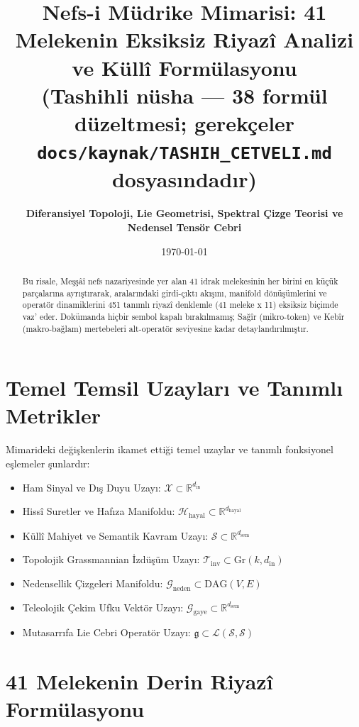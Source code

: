 \documentclass[11pt, a4paper]{article}
\title{\textbf{Nefs-i Müdrike Mimarisi: 41 Melekenin Eksiksiz Riyazî Analizi ve Küllî Formülasyonu}\\ \normalsize\textmd{(Tashihli nüsha --- 38 formül düzeltmesi; gerekçeler \texttt{docs/kaynak/TASHIH\_CETVELI.md} dosyasındadır)}}
\author{\textbf{Diferansiyel Topoloji, Lie Geometrisi, Spektral Çizge Teorisi ve Nedensel Tensör Cebri}}
\date{\today}
\begin{document}
\maketitle

\begin{abstract}
Bu risale, Meşşâî nefs nazariyesinde yer alan 41 idrak melekesinin her birini en küçük parçalarına ayrıştırarak, aralarındaki girdi-çıktı akışını, manifold dönüşümlerini ve operatör dinamiklerini 451 tanımlı riyazî denklemle (41 meleke x 11) eksiksiz biçimde vaz' eder. Dokümanda hiçbir sembol kapalı bırakılmamış; Sağîr (mikro-token) ve Kebîr (makro-bağlam) mertebeleri alt-operatör seviyesine kadar detaylandırılmıştır.
\end{abstract}

\section{Temel Temsil Uzayları ve Tanımlı Metrikler}

Mimarideki değişkenlerin ikamet ettiği temel uzaylar ve tanımlı fonksiyonel eşlemeler şunlardır:
\begin{itemize}
    \item Ham Sinyal ve Dış Duyu Uzayı: $\mathcal{X} \subset \mathbb{R}^{d_{\text{in}}}$
    \item Hissî Suretler ve Hafıza Manifoldu: $\mathcal{H}_{\text{hayal}} \subset \mathbb{R}^{d_{\text{hayal}}}$
    \item Küllî Mahiyet ve Semantik Kavram Uzayı: $\mathcal{S} \subset \mathbb{R}^{d_{\text{sem}}}$
    \item Topolojik Grassmannian İzdüşüm Uzayı: $\mathcal{T}_{\text{inv}} \subset \text{Gr}(k, d_{\text{in}})$
    \item Nedensellik Çizgeleri Manifoldu: $\mathcal{G}_{\text{neden}} \subset \text{DAG}(V, E)$
    \item Teleolojik Çekim Ufku Vektör Uzayı: $\mathcal{G}_{\text{gaye}} \subset \mathbb{R}^{d_{\text{sem}}}$
    \item Mutasarrıfa Lie Cebri Operatör Uzayı: $\mathfrak{g} \subset \mathcal{L}(\mathcal{S}, \mathcal{S})$
\end{itemize}

\section{41 Melekenin Derin Riyazî Formülasyonu}
\end{document}
